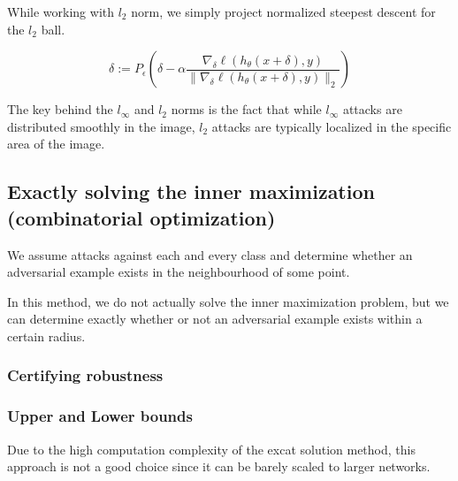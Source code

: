While working with $l_2$ norm, we simply project normalized steepest descent for the $l_2$ ball. 

\[\delta := P_{\epsilon}\left(\delta - \alpha \frac{\nabla_{\delta} \ell(h_{\theta}(x + \delta), y)}{\|\nabla_{\delta} \ell(h_{\theta}(x + \delta), y)\|_2}\right)\]

The key behind the $l_\infty$ and $l_2$ norms is the fact that while $l_\infty$ attacks are distributed smoothly in the image, 
$l_2$ attacks are typically localized in the specific area of the image. 




\subsection{Exactly solving the inner maximization (combinatorial optimization)}

We assume attacks against each and every class and determine whether an 
adversarial example exists in the neighbourhood of some point.

In this method, we do not actually solve the inner maximization problem, but we can determine exactly whether or not an adversarial
example exists within a certain radius. 

\subsubsection{Certifying robustness}




\subsubsection{Upper and Lower bounds}

Due to the high computation complexity of the excat solution method, this approach is not a good choice since it can be barely scaled to larger networks. 

